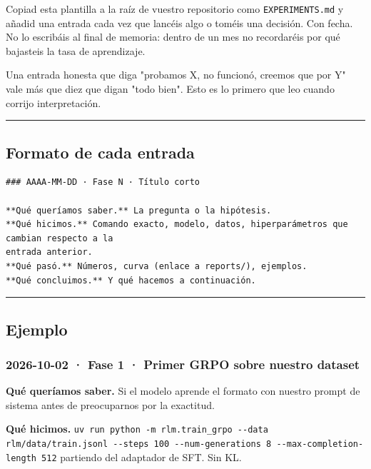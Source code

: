 \begingroup\raggedright\sloppy
Copiad esta plantilla a la raíz de vuestro repositorio como \texttt{EXPERIMENTS.md} y añadid una
entrada cada vez que lancéis algo o toméis una decisión. Con fecha. No lo escribáis al final
de memoria: dentro de un mes no recordaréis por qué bajasteis la tasa de aprendizaje.

Una entrada honesta que diga "probamos X, no funcionó, creemos que por Y" vale más que diez
que digan "todo bien". Esto es lo primero que leo cuando corrijo interpretación.

\begin{center}\rule{0.5\linewidth}{0.5pt}\end{center}

\subsection{Formato de cada entrada}

\begin{lstlisting}
### AAAA-MM-DD · Fase N · Título corto

**Qué queríamos saber.** La pregunta o la hipótesis.
**Qué hicimos.** Comando exacto, modelo, datos, hiperparámetros que cambian respecto a la
entrada anterior.
**Qué pasó.** Números, curva (enlace a reports/), ejemplos.
**Qué concluimos.** Y qué hacemos a continuación.
\end{lstlisting}

\begin{center}\rule{0.5\linewidth}{0.5pt}\end{center}

\subsection{Ejemplo}

\subsubsection{2026-10-02 · Fase 1 · Primer GRPO sobre nuestro dataset}

\textbf{Qué queríamos saber.} Si el modelo aprende el formato con nuestro prompt de sistema antes
de preocuparnos por la exactitud.

\textbf{Qué hicimos.} \texttt{uv run python -m rlm.train\_\allowbreak{}grpo -\/\allowbreak{}-data rlm/\allowbreak{}data/\allowbreak{}train.jsonl -\/\allowbreak{}-steps 100 -\/\allowbreak{}-num-generations 8 -\/\allowbreak{}-max-completion-length 512} partiendo del adaptador de SFT. Sin KL.

